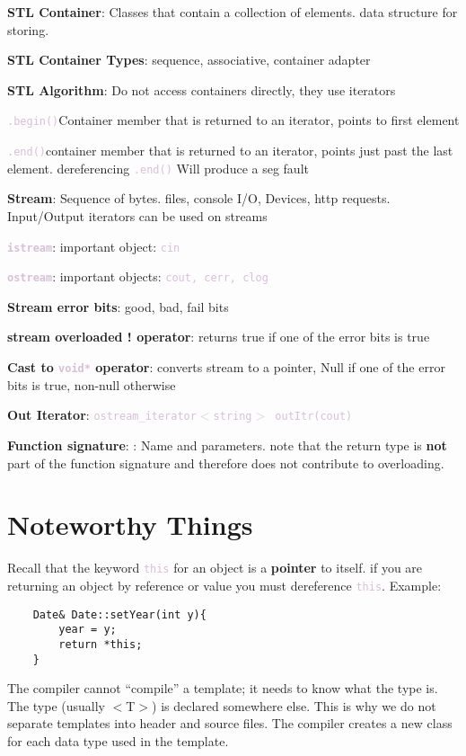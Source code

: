 \documentclass{article}
\newcommand{\code}[1]{\textcolor{Thistle}{\texttt{#1}}}
\newcommand{\definition}[2]{\textbf{#1}: #2}
\begin{document}
{\definition{STL Container}{Classes that contain a collection of elements. data structure for storing.}

\definition{STL Container Types}{sequence, associative, container adapter}

\definition{STL Algorithm}{Do not access containers directly, they use iterators}

\code{.begin()}{Container member that is returned to an iterator, points to first element}

\code{.end()}{container member that is returned to an iterator, points just past the last element. dereferencing \code{.end()} Will produce a seg fault}

\definition{Stream}{Sequence of bytes. files, console I/O, Devices, http requests. Input/Output iterators can be used on streams}

\definition{\code{istream}}{important object: \code{cin}}

\definition{\code{ostream}}{important objects: \code{cout, cerr, clog}}

\definition{Stream error bits}{good, bad, fail bits}

\definition{stream overloaded ! operator}{returns true if one of the error bits is true}

\definition{Cast to \code{void*} operator}{converts stream to a pointer, Null if one of the error bits is true, non-null otherwise}

\definition{Out Iterator}{\code{ostream\_iterator$<$string$>$ outItr(cout)}} 

\definition{Function signature}: Name and parameters. note that the return type is \textbf{not} part of the function signature and therefore does not contribute to overloading.

\section*{Noteworthy Things}

Recall that the keyword \code{this} for an object is a \textbf{pointer} to itself. if you are returning an object by reference or value  you must dereference \code{this}. Example: 
\begin{verbatim}
    Date& Date::setYear(int y){
        year = y;
        return *this;
    }
\end{verbatim}

The compiler cannot ``compile'' a template; it needs to know what the type is. The type (usually $<$T$>$) is declared somewhere else. This is why we do not separate templates into header and source files. The compiler creates a new class for each data type used in the template.

}
\end{document}
